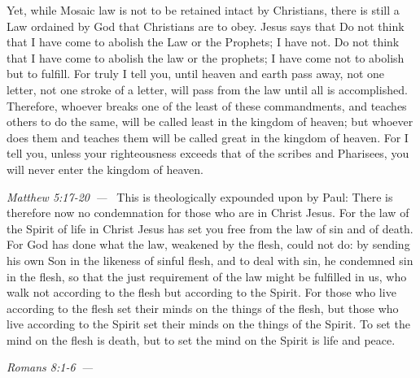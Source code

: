 \documentclass[10pt]{article}
\let\oldquote\quote
\let\endoldquote\endquote
\renewenvironment{quote}[2][]
  {\if\relax\detokenize{#1}\relax
     \def\quoteauthor{#2}%
   \else
     \def\quoteauthor{#2~---~#1}%
   \fi
   \oldquote}
  {\par\nobreak\smallskip\hfill\textit{\quoteauthor}%
   \endoldquote\addvspace{\bigskipamount}}
\begin{document}
Yet, while Mosaic law is not to be retained intact by Christians, there is still a Law ordained by God that Christians are to obey. Jesus says that 
\begin{quote}{Matthew 5:17-20}
Do not think that I have come to abolish the Law or the Prophets; I have not. Do not think that I have come to abolish the law or the prophets; I have come not to abolish but to fulfill. For truly I tell you, until heaven and earth pass away, not one letter, not one stroke of a letter, will pass from the law until all is accomplished. Therefore, whoever breaks one of the least of these commandments, and teaches others to do the same, will be called least in the kingdom of heaven; but whoever does them and teaches them will be called great in the kingdom of heaven. For I tell you, unless your righteousness exceeds that of the scribes and Pharisees, you will never enter the kingdom of heaven.
\end{quote}
This is theologically expounded upon by Paul:
\begin{quote}{Romans 8:1-6}
There is therefore now no condemnation for those who are in Christ Jesus. For the law of the Spirit of life in Christ Jesus has set you free from the law of sin and of death. For God has done what the law, weakened by the flesh, could not do: by sending his own Son in the likeness of sinful flesh, and to deal with sin, he condemned sin in the flesh, so that the just requirement of the law might be fulfilled in us, who walk not according to the flesh but according to the Spirit. For those who live according to the flesh set their minds on the things of the flesh, but those who live according to the Spirit set their minds on the things of the Spirit. To set the mind on the flesh is death, but to set the mind on the Spirit is life and peace. 
\end{quote}
\end{document}
